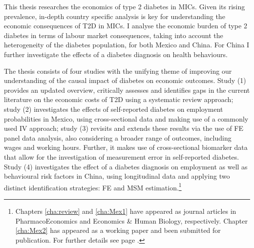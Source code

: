 This thesis researches the economics of type 2 diabetes in \acfp{MIC}. Given its rising prevalence, in-depth country specific analysis is key for understanding the economic consequences of T2D in \acp{MIC}. I analyse the economic burden of type 2 diabetes in terms of labour market consequences, taking into account the heterogeneity of the diabetes population, for both Mexico and China. For China I further investigate the effects of a diabetes diagnosis on health behaviours.

The thesis consists of four studies with the unifying theme of improving our understanding of the causal impact of diabetes on  economic outcomes. Study (1) provides an updated overview, critically assesses and identifies gaps in the current literature on the economic costs of T2D using a systematic review approach; study (2) investigates the effects of self-reported diabetes on employment probabilities in Mexico, using cross-sectional data and making use of a commonly used \acf{IV} approach; study (3) revisits and extends these results via the use of \ac{FE} panel data analysis, also considering a broader range of outcomes, including wages and working hours. Further, it makes use of cross-sectional biomarker data that allow for the investigation of measurement error in self-reported diabetes. Study (4) investigates the effect of a diabetes diagnosis on employment as well as behavioural risk factors in China, using longitudinal data and applying two distinct identification strategies: \ac{FE} and \acf{MSM} estimation.\footnote{Chapters \ref{cha:review} and \ref{cha:Mex1} have appeared as journal articles in PharmacoEconomics and Economics \& Human Biology, respectively. Chapter \ref{cha:Mex2} has appeared as a working paper and been submitted for publication. For further details see page \pageref{publication_statement}.}

